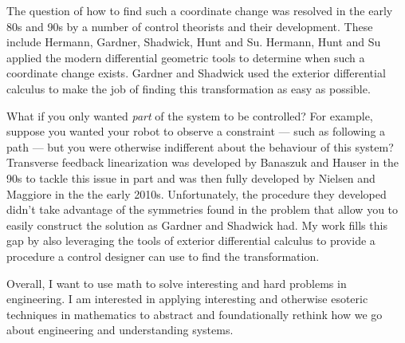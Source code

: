 The question of how to find such a coordinate change was resolved in the early 80s and 90s by a number of control theorists and their development.
These include Hermann, Gardner, Shadwick, Hunt and Su.
Hermann, Hunt and Su applied the modern differential geometric tools to determine when such a coordinate change exists.
Gardner and Shadwick used the exterior differential calculus to make the job of finding this transformation as easy as possible.

What if you only wanted \emph{part} of the system to be controlled?
For example, suppose you wanted your robot to observe a constraint --- such as following a path --- but you were otherwise indifferent about the behaviour of this system?
Transverse feedback linearization was developed by Banaszuk and Hauser in the 90s to tackle this issue in part and was then fully developed by Nielsen and Maggiore in the the early 2010s.
Unfortunately, the procedure they developed didn't take advantage of the symmetries found in the problem that allow you to easily construct the solution as Gardner and Shadwick had.
My work fills this gap by also leveraging the tools of exterior differential calculus to provide a procedure a control designer can use to find the transformation.

Overall, I want to use math to solve interesting and hard problems in engineering.
I am interested in applying interesting and otherwise esoteric techniques in mathematics to abstract and foundationally rethink how we go about engineering and understanding systems.
